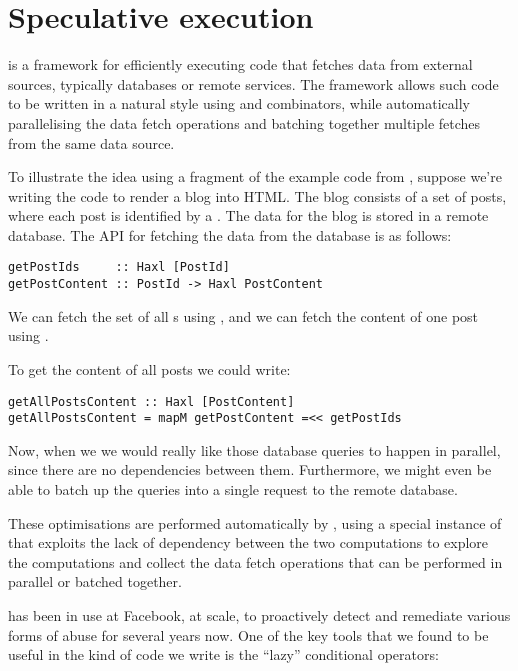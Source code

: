 \section{Speculative execution}\label{sec-haxl}

\Haxl\cite{haxl} is a framework for efficiently executing code that
fetches data from external sources, typically databases or remote
services. The \Haxl framework allows such code to be written in a
natural style using  and  combinators, while
automatically parallelising the data fetch operations and batching
together multiple fetches from the same data source.

To illustrate the idea using a fragment of the example code from
\citep{Haxl}, suppose we're writing the code to render a blog into
HTML. The blog consists of a set of posts, where each post is
identified by a .  The data for the blog is stored in a
remote database.  The API for fetching the data from the database is
as follows:

\begin{verbatim}
getPostIds     :: Haxl [PostId]
getPostContent :: PostId -> Haxl PostContent
\end{verbatim}

We can fetch the set of all s using , and we
can fetch the content of one post using .

To get the content of all posts we could write:

\begin{verbatim}
getAllPostsContent :: Haxl [PostContent]
getAllPostsContent = mapM getPostContent =<< getPostIds
\end{verbatim}

Now, when we  we would really like those
database queries to happen in parallel, since there are no
dependencies between them. Furthermore, we might even be able to batch
up the queries into a single request to the remote database.

These optimisations are performed automatically by \Haxl, using a
special instance of  that exploits the lack of dependency
between the two computations to explore the computations and collect
the data fetch operations that can be performed in parallel or batched
together.

\Haxl has been in use at Facebook, at scale, to proactively detect and
remediate various forms of abuse for several years now.  One of the
key tools that we found to be useful in the kind of code we write is
the ``lazy'' conditional operators:

